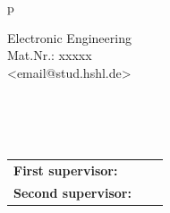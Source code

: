 \begin{center}
\begin{tabular}{p{\textwidth}}
\begin{center}
Electronic Engineering\\%
Mat.Nr.: xxxxx\\
<email@stud.hshl.de>\\
\vspace{0.5cm}
\large{\mydate}


\end{center}

\\
\\
\\

\begin{center}
\begin{tabular}{lll}
\textbf{First supervisor:} & & \firstexaminer\\
\textbf{Second supervisor:} & & \secondexaminer\\
\end{tabular}
\end{center}

\end{tabular}
\end{center}